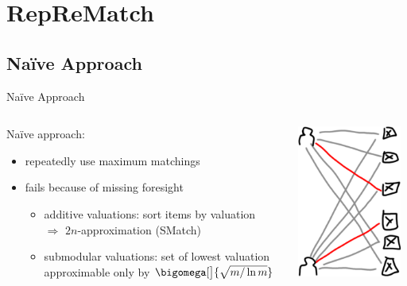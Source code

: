 \section{RepReMatch}

\subsection{Naïve Approach}
\begin{frame}{Naïve Approach}
	\begin{columns}[t, onlytextwidth]
		\begin{column}{0.6\textwidth}
			Naïve approach:
			\begin{itemize}
				\item
				repeatedly use maximum matchings

				\item
				fails because of missing foresight
				\begin{itemize}
					\item
					additive valuations:
					sort items by valuation \\
					\(\Rightarrow\) \(2n\)-approximation (SMatch)

					\item
					submodular valuations:
					set of lowest valuation \\
					approximable only by \(\bigomega[\big]{ \sqrt{m/\ln m} }\) \smash{\raisebox{-.25ex}{\Large\Lightning}}
				\end{itemize}
			\end{itemize}
		\end{column}
		\begin{column}{0.4\textwidth}
			\vphantom{a}\vspace{-0.5\baselineskip}\par
			\centering
			\includegraphics[height=5cm]{img/repeatedmatching}
		\end{column}
	\end{columns}
\end{frame}





